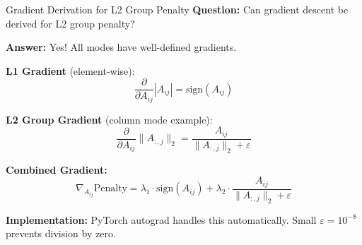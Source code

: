 \documentclass[aspectratio=169]{beamer}
\begin{document}
\begin{frame}{Gradient Derivation for L2 Group Penalty}
\textbf{Question:} Can gradient descent be derived for L2 group penalty?

\vspace{0.2cm}
\textbf{Answer:} \textcolor{reprogreen}{Yes!} All modes have well-defined gradients.

\vspace{0.3cm}
\textbf{L1 Gradient} (element-wise):
\begin{equation*}
\frac{\partial}{\partial A_{ij}} |A_{ij}| = \text{sign}(A_{ij})
\end{equation*}

\textbf{L2 Group Gradient} (column mode example):
\begin{equation*}
\frac{\partial}{\partial A_{ij}} \|A_{:,j}\|_2 = \frac{A_{ij}}{\|A_{:,j}\|_2 + \varepsilon}
\end{equation*}

\textbf{Combined Gradient:}
\begin{equation*}
\nabla_{A_{ij}} \text{Penalty} = \lambda_1 \cdot \text{sign}(A_{ij}) + \lambda_2 \cdot \frac{A_{ij}}{\|A_{:,j}\|_2 + \varepsilon}
\end{equation*}

\vspace{0.2cm}
\textbf{Implementation:} PyTorch autograd handles this automatically. Small $\varepsilon = 10^{-8}$ prevents division by zero.
\end{frame}
\end{document}
